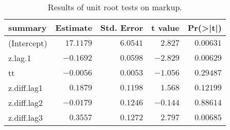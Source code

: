 \begin{table}[!tbp]
\caption{Results of unit root tests on markup.\label{summary}} 
\begin{center}
\begin{tabular}{lrrrr}
\hline\hline
\multicolumn{1}{l}{summary}&\multicolumn{1}{c}{Estimate}&\multicolumn{1}{c}{Std. Error}&\multicolumn{1}{c}{t value}&\multicolumn{1}{c}{Pr(\textgreater |t|)}\tabularnewline
\hline
(Intercept)&$17.1179$&$6.0541$&$ 2.827$&$0.00631$\tabularnewline
z.lag.1&$-0.1692$&$0.0598$&$-2.829$&$0.00629$\tabularnewline
tt&$-0.0056$&$0.0053$&$-1.056$&$0.29487$\tabularnewline
z.diff.lag1&$ 0.1879$&$0.1198$&$ 1.568$&$0.12199$\tabularnewline
z.diff.lag2&$-0.0179$&$0.1246$&$-0.144$&$0.88614$\tabularnewline
z.diff.lag3&$ 0.3557$&$0.1272$&$ 2.797$&$0.00685$\tabularnewline
\hline
\end{tabular}\end{center}

\end{table}
